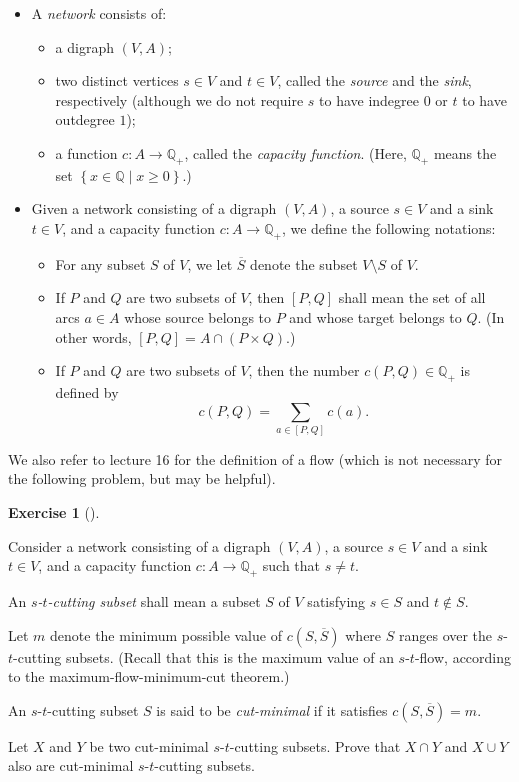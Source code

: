 \documentclass[numbers=enddot,12pt,final,onecolumn,notitlepage]{scrartcl}%
\newcounter{exer}
\theoremstyle{definition}
\newtheorem{exmp}[exer]{Exercise}
\newenvironment{exercise}[1][]
{\begin{exmp}[#1]\begin{leftbar}}
{\end{leftbar}\end{exmp}}
\let\sumnonlimits\sum
\renewcommand{\sum}{\sumnonlimits\limits}
\newcommand{\QQ}{\mathbb{Q}}
\newcommand{\set}[1]{\left\{ #1 \right\}}
\newcommand{\tup}[1]{\left( #1 \right)}
\newcommand{\ive}[1]{\left[ #1 \right]}
\begin{document}
\begin{itemize}
\item A \textit{network} consists of:
      \begin{itemize}
      \item a digraph $\tup{V, A}$;
      \item two distinct vertices $s \in V$ and $t \in V$,
            called the \textit{source} and the \textit{sink},
            respectively (although we do not require $s$ to
            have indegree $0$ or $t$ to have outdegree $1$);
      \item a function $c : A \to \QQ_+$, called the
            \textit{capacity function}.
            (Here, $\QQ_+$ means the set
            $\set{ x \in \QQ \mid x \geq 0 }$.)
      \end{itemize}

\item Given a network consisting of a digraph
      $\tup{V, A}$, a source $s \in V$ and a sink $t \in V$,
      and a capacity function $c : A \to \QQ_+$, we define
      the following notations:
      \begin{itemize}
      \item For any subset $S$ of $V$, we let $\overline{S}$
            denote the subset $V \setminus S$ of $V$.
      \item If $P$ and $Q$ are two subsets of $V$, then
            $\ive{P, Q}$ shall mean the set of all arcs
            $a \in A$ whose source belongs to $P$ and whose
            target belongs to $Q$.
            (In other words,
            $\ive{P, Q} = A \cap \tup{P \times Q}$.)
      \item If $P$ and $Q$ are two subsets of $V$, then the
            number $c \tup{P, Q} \in \QQ_+$ is defined by
            \[
            c \tup{P, Q} = \sum_{a \in \ive{P, Q}} c \tup{a} .
            \]
      \end{itemize}
\end{itemize}

We also refer to lecture 16 for the definition of a flow
(which is not necessary for the following problem, but may
be helpful).

\begin{exercise} \label{exe.flows-cuts.cut-lattice}
Consider a network consisting of a digraph
$\tup{V, A}$, a source $s \in V$ and a sink $t \in V$,
and a capacity function $c : A \to \QQ_+$
such that $s \neq t$.

An \textit{$s$-$t$-cutting subset} shall mean a subset
$S$ of $V$ satisfying $s \in S$ and $t \notin S$.

Let $m$ denote the minimum possible value of
$c \tup{S, \overline{S}}$ where $S$ ranges over the
$s$-$t$-cutting subsets.
(Recall that this is the maximum value of an
$s$-$t$-flow, according to the
maximum-flow-minimum-cut theorem.)

An $s$-$t$-cutting subset $S$ is said to be
\textit{cut-minimal} if it satisfies
$c \tup{S, \overline{S}} = m$.

Let $X$ and $Y$ be two cut-minimal $s$-$t$-cutting subsets.
Prove that $X \cap Y$ and $X \cup Y$ also are
cut-minimal $s$-$t$-cutting subsets.
\end{exercise}
\end{document}
